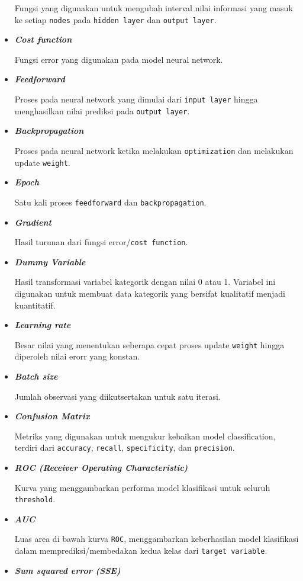 \documentclass[
]{article}
\begin{document}
\begin{itemize}
  Fungsi yang digunakan untuk mengubah interval nilai informasi yang
  masuk ke setiap \texttt{nodes} pada \texttt{hidden\ layer} dan
  \texttt{output\ layer}.
\item
  \textbf{\emph{Cost function}}

  Fungsi error yang digunakan pada model neural network.
\item
  \textbf{\emph{Feedforward}}

  Proses pada neural network yang dimulai dari \texttt{input\ layer}
  hingga menghasilkan nilai prediksi pada \texttt{output\ layer}.
\item
  \textbf{\emph{Backpropagation}}

  Proses pada neural network ketika melakukan \texttt{optimization} dan
  melakukan update \texttt{weight}.
\item
  \textbf{\emph{Epoch}}

  Satu kali proses \texttt{feedforward} dan \texttt{backpropagation}.
\item
  \textbf{\emph{Gradient}}

  Hasil turunan dari fungsi error/\texttt{cost\ function}.
\item
  \textbf{\emph{Dummy Variable}}

  Hasil transformasi variabel kategorik dengan nilai 0 atau 1. Variabel
  ini digunakan untuk membuat data kategorik yang bersifat kualitatif
  menjadi kuantitatif.
\item
  \textbf{\emph{Learning rate}}

  Besar nilai yang menentukan seberapa cepat proses update
  \texttt{weight} hingga diperoleh nilai erorr yang konstan.
\item
  \textbf{\emph{Batch size}}

  Jumlah observasi yang diikutsertakan untuk satu iterasi.
\item
  \textbf{\emph{Confusion Matrix}}

  Metriks yang digunakan untuk mengukur kebaikan model classification,
  terdiri dari \texttt{accuracy}, \texttt{recall}, \texttt{specificity},
  dan \texttt{precision}.
\item
  \textbf{\emph{ROC (Receiver Operating Characteristic)}}

  Kurva yang menggambarkan performa model klasifikasi untuk seluruh
  \texttt{threshold}.
\item
  \textbf{\emph{AUC}}

  Luas area di bawah kurva \texttt{ROC}, menggambarkan keberhasilan
  model klasifikasi dalam memprediksi/membedakan kedua kelas dari
  \texttt{target\ variable}.
\item
  \textbf{\emph{Sum squared error (SSE)}}


\end{itemize}
\end{document}
